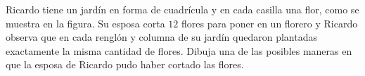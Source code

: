 Ricardo tiene un jardín en forma de cuadrícula y en cada casilla una flor, como se muestra en la figura. Su esposa corta $12$ flores para poner en un florero y Ricardo observa que en cada renglón y columna de su jardín quedaron plantadas exactamente la misma cantidad de flores. Dibuja una de las posibles maneras en que la esposa de Ricardo pudo haber cortado las flores.